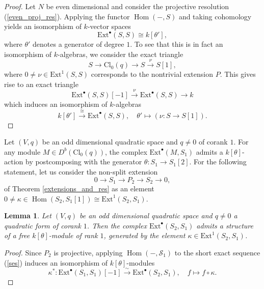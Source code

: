 \documentclass[a4paper, twoside, 11pt]{amsart}
\newtheorem{lemma}[theorem]{Lemma}
\theoremstyle{definition}
\theoremstyle{remark}
\numberwithin{equation}{theorem}
\DeclareMathOperator{\Hom}{Hom}
\newcommand{\evencl}{\mathrm{Cl}_0}
\begin{document}
\begin{proof}
    Let $N$ be even dimensional and consider the projective resolution (\ref{even_proj_res}). 
    Applying the functor $\Hom(-,S)$ and taking cohomology yields an isomorphism of $k$-vector spaces
    \begin{equation*}
        \mathrm{Ext}^{\bullet}(S,S) \cong k[\theta'], 
    \end{equation*}
    where $\theta'$ denotes a generator of degree $1$. To see that this is in fact an isomorphism of $k$-algebras, we consider the exact triangle 
    \begin{equation*}
         S \longrightarrow \evencl(q) \longrightarrow S\overset{\nu}{\longrightarrow} S[1],
    \end{equation*}
    where $0\neq \nu \in \mathrm{Ext}^1(S,S)$ corresponds to the nontrivial extension $P$. This gives rise to an exact triangle
    \begin{equation*}
        \mathrm{Ext}^{\bullet}(S,S)[-1] \overset{\nu}{\longrightarrow} \mathrm{Ext}^{\bullet}(S,S) \longrightarrow k
    \end{equation*}
    which induces an isomorphism of $k$-algebras 
    \begin{equation*}
        k[\theta'] \overset{\cong}{\longrightarrow}\mathrm{Ext}^{\bullet}(S,S), \quad \theta' \mapsto (\nu\colon S \to S[1]).
    \end{equation*}
\end{proof}
Let $(V,q)$ be an odd dimensional quadratic space and $q\neq 0$ of corank $1$. For any module $M \in D^b(\evencl(q))$, the complex $\mathrm{Ext}^{\bullet}(M,S_1)$ admits a $k[\theta]$-action by postcomposing with the generator $\theta\colon S_1 \to S_1[2]$. For the following statement, let us consider the non-split extension 
\begin{equation}\label{ses}
        0 \longrightarrow S_1 \longrightarrow P_2 \longrightarrow S_2 \longrightarrow 0,
\end{equation}
of Theorem \ref{extensions_and_res} as an element $0\neq \kappa \in \Hom(S_2, S_1[1]) \cong \mathrm{Ext}^{1}(S_2, S_1)$.
\begin{lemma}\label{module-structure}
    Let $(V,q)$ be an odd dimensional quadratic space and $q\neq 0$ a quadratic form of corank $1$. Then the complex $\mathrm{Ext}^{\bullet}(S_2, S_1)$ admits a structure of a free $k[\theta]$-module of rank $1$, generated by the element $\kappa \in \mathrm{Ext}^{1}(S_2, S_1)$.
\end{lemma}
\begin{proof}
    Since $P_2$ is projective, applying $\Hom(-,\mathcal{S}_1)$ to the short exact sequence (\ref{ses})
    induces an isomorphism of $k[\theta]$-modules
	\begin{equation}\label{k_theta_module}
		\kappa^*\colon\mathrm{Ext}^{\bullet}(S_1, S_1)[-1] \overset{\sim}{\longrightarrow}\mathrm{Ext}^{\bullet}(S_2,S_1), \quad f \mapsto f\circ \kappa.
	\end{equation}
\end{proof}
\end{document}
